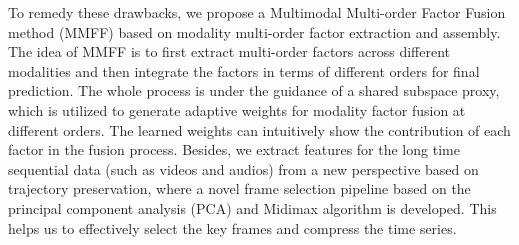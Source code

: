 \documentclass{article}
\begin{document}
To remedy these drawbacks, we propose a Multimodal Multi-order Factor Fusion method (MMFF) based on modality multi-order factor extraction and assembly. The idea of MMFF is to first extract multi-order factors across different modalities and then integrate the factors in terms of different orders for final prediction.
The whole process is under the guidance of a shared subspace proxy, which is utilized to generate adaptive weights for modality factor fusion at different orders. The learned weights can intuitively show the contribution of each factor in the fusion process.
Besides, we extract features for the long time sequential data (such as videos and audios) from a new perspective based on trajectory preservation, where a novel frame selection pipeline based on the principal component analysis (PCA) and Midimax algorithm is developed. This helps us to effectively select the key frames and compress the time series.

\end{document}
